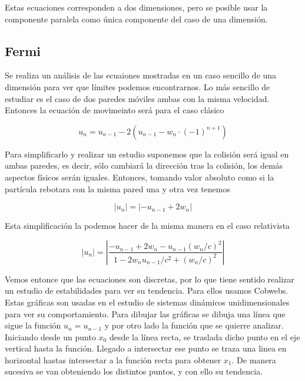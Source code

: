 \documentclass[11pt, spanish]{article}
\begin{document}
Estas ecuaciones corresponden a dos dimensiones, pero se posible usar la componente paralela como única componente del caso de una dimensión.

\subsection{Fermi}

Se realiza un análisis de las ecuaiones mostradas en un caso sencillo de una dimensión para ver que límites podemos encontrarnos. Lo más sencillo de estudiar es el caso de dos paredes móviles ambas con la misma velocidad. Entonces la ecuación de movimeinto será para el caso clásico

\begin{equation}\label{eq:velocidad_discreta_1D}
    u_n = u_{n-1} - 2\left( u_{n-1} - w_n \cdot (-1)^{n+1} \right)
\end{equation}

Para simplificarlo y realizar un estudio suponemos que la colisión será igual en ambas paredes, es decir, sólo cambiará la dirección tras la colisión, los demás aspectos físicos serán iguales. Entonces, tomando valor absoluto como si la partícula rebotara con la misma pared una y otra vez tenemos

\begin{equation}\label{eq:valor_absoluto_clasico}
    \left| u_n \right| =\left| -u_{n-1} + 2w_n \right|
\end{equation}

Esta simplificación la podemos hacer de la misma manera en el caso relativista

\begin{equation}\label{eq:valor_absoluto_relativista}
    \left| u_n \right| = \left|  \dfrac{-u_{n-1} + 2w_n - u_{n-1}(w_n/c)^2}{1 - 2w_n u_{n-1}/c^2 + (w_n/c)^2} \right|
\end{equation}

Vemos entonce que las ecuaciones son discretas, por lo que tiene sentido realizar un estudio de estabilidades para ver su tendencia. Para ellos usamos Cobwebs. Estas gráficas son usadas en el estudio de sistemas dinámicos unidimensionales para ver su comportamiento. Para dibujar las gráficas se dibuja una línea que sigue la función \( u_n = u_{n-1} \) y por otro lado la función que se quierre analizar. Iniciando desde un punto \( x_0 \) desde la línea recta, se traslada dicho punto en el eje vertical hasta la función. Llegado a intersectar ese punto se traza una linea en horizontal hastas intersectar a la función recta para obtener \( x_1 \). De manera sucesiva se van obteniendo los distintos puntos, y con ello su tendencia. 
\end{document}
